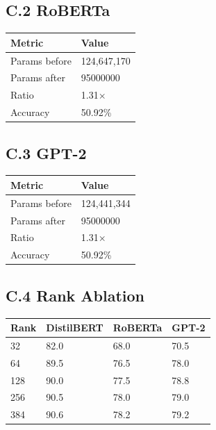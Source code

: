 \subsection{C.2 RoBERTa}

\begin{table}[H]
\centering
\small
\begin{tabular}{ll}
\toprule
\textbf{Metric} & \textbf{Value} \\
\midrule
Params before & 124,647,170 \\
Params after & 95000000 \\
Ratio & 1.31$\times$ \\
Accuracy & 50.92\% \\
\bottomrule
\end{tabular}
\end{table}

\subsection{C.3 GPT-2}

\begin{table}[H]
\centering
\small
\begin{tabular}{ll}
\toprule
\textbf{Metric} & \textbf{Value} \\
\midrule
Params before & 124,441,344 \\
Params after & 95000000 \\
Ratio & 1.31$\times$ \\
Accuracy & 50.92\% \\
\bottomrule
\end{tabular}
\end{table}

\subsection{C.4 Rank Ablation}

\begin{table}[H]
\centering
\small
\begin{tabular}{llll}
\toprule
\textbf{Rank} & \textbf{DistilBERT} & \textbf{RoBERTa} & \textbf{GPT-2} \\
\midrule
32 & 82.0 & 68.0 & 70.5 \\
64 & 89.5 & 76.5 & 78.0 \\
128 & 90.0 & 77.5 & 78.8 \\
256 & 90.5 & 78.0 & 79.0 \\
384 & 90.6 & 78.2 & 79.2 \\
\bottomrule
\end{tabular}
\end{table}

